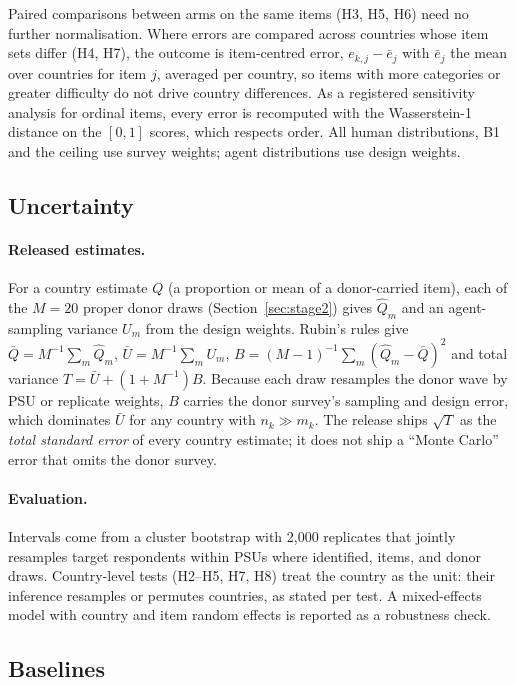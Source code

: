 \documentclass[10pt]{article}
\begin{document}
Paired comparisons between arms on the same items (H3, H5, H6) need no further normalisation. Where errors are compared across countries whose item sets differ (H4, H7), the outcome is item-centred error, $e_{k,j} - \bar e_j$ with $\bar e_j$ the mean over countries for item $j$, averaged per country, so items with more categories or greater difficulty do not drive country differences. As a registered sensitivity analysis for ordinal items, every error is recomputed with the Wasserstein-1 distance on the $[0,1]$ scores, which respects order. All human distributions, B1 and the ceiling use survey weights; agent distributions use design weights.

\subsection{Uncertainty}
\label{sec:uncertainty}

\paragraph{Released estimates.} For a country estimate $Q$ (a proportion or mean of a donor-carried item), each of the $M=20$ proper donor draws (Section~\ref{sec:stage2}) gives $\hat Q_m$ and an agent-sampling variance $U_m$ from the design weights. Rubin's rules \citep{rubin1987} give $\bar Q = M^{-1}\sum_m \hat Q_m$, $\bar U = M^{-1}\sum_m U_m$, $B = (M-1)^{-1}\sum_m(\hat Q_m-\bar Q)^2$ and total variance $T = \bar U + (1+M^{-1})B$. Because each draw resamples the donor wave by PSU or replicate weights, $B$ carries the donor survey's sampling and design error, which dominates $\bar U$ for any country with $n_k \gg m_k$. The release ships $\sqrt{T}$ as the \emph{total standard error} of every country estimate; it does not ship a ``Monte Carlo'' error that omits the donor survey.

\paragraph{Evaluation.} Intervals come from a cluster bootstrap with 2,000 replicates that jointly resamples target respondents within PSUs where identified, items, and donor draws. Country-level tests (H2--H5, H7, H8) treat the country as the unit: their inference resamples or permutes countries, as stated per test. A mixed-effects model with country and item random effects is reported as a robustness check.

\subsection{Baselines}
\end{document}
